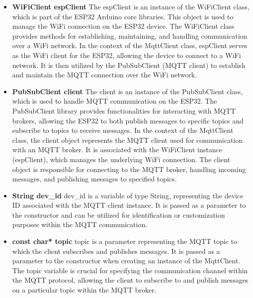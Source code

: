 \begin{itemize}
	\item \textbf{WiFiClient espClient}
	\newline
	The espClient is an instance of the WiFiClient class, which is part of the ESP32 Arduino core libraries. 
	This object is used to manage the WiFi connection on the ESP32 device. 
	The WiFiClient class provides methods for establishing, maintaining, and handling communication over a WiFi network.
	\vspace{4pt}
	\newline
	In the context of the MqttClient class, espClient serves as the WiFi client for the ESP32, allowing the device to connect to a WiFi network. 
	It is then utilized by the PubSubClient (MQTT client) to establish and maintain the MQTT connection over the WiFi network. 
	
	\item \textbf{PubSubClient client}
	\newline
	The client is an instance of the PubSubClient class, which is used to handle MQTT communication on the ESP32. 
	The PubSubClient library provides functionalities for interacting with MQTT brokers, allowing the ESP32 to both publish messages to specific topics and subscribe to topics to receive messages.
	\vspace{4pt}
	\newline
	In the context of the MqttClient class, the client object represents the MQTT client used for communication with an MQTT broker. 
	It is associated with the WiFiClient instance (espClient), which manages the underlying WiFi connection. 
	The client object is responsible for connecting to the MQTT broker, handling incoming messages, and publishing messages to specified topics.
	
	\item \textbf{String dev\_id}
	\newline
	dev\_id is a variable of type String, representing the device ID associated with the MQTT client instance. 
	It is passed as a parameter to the constructor and can be utilized for identification or customization purposes within the MQTT communication. 
	
	\item \textbf{const char* topic}
	\newline
	topic is a parameter representing the MQTT topic to which the client subscribes and publishes messages. 
	It is passed as a parameter to the constructor when creating an instance of the MqttClient. 
	The topic variable is crucial for specifying the communication channel within the MQTT protocol, allowing the client to subscribe to and publish messages on a particular topic within the MQTT broker. 
	
\end{itemize}

